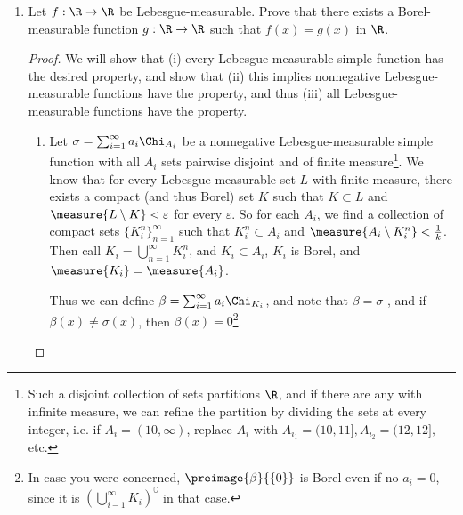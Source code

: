 \documentclass[12pt,letterpaper]{article}
\begin{document}
\begin{enumerate}
\pagebreak
\item Let $f:\R\to\R$ be Lebesgue-measurable. Prove that there exists a Borel-measurable function $g:\R\to\R$ such that $f(x)=g(x)$ \muae{} in $\R$. 
\begin{proof}
We will show that (i) every Lebesgue-measurable simple function has the desired property, and show that (ii) this implies nonnegative Lebesgue-measurable functions have the property, and thus (iii) all Lebesgue-measurable functions have the property. 
	\begin{enumerate}[label=(\roman*)]
	\item Let $\sigma	= \sum_{i=1}^\infty a_i \Chi_{A_i}$ be a nonnegative Lebesgue-measurable simple function with all $A_i$ sets pairwise disjoint and of finite measure\footnote{Such a disjoint collection of sets partitions $\R$, and if there are any with infinite measure, we can refine the partition by dividing the sets at every integer, i.e. if $A_i=(10,\infty)$, replace $A_i$ with $A_{i_1}=(10, 11], A_{i_2}=(12, 12],$ etc.}. 
We know that for every Lebesgue-measurable set $L$ with finite measure, there exists a compact (and thus Borel) set $K$ such that $K\subset L$ and $\measure{L\setminus K}<\varepsilon$ for every $\varepsilon$. So for each $A_i$, we find a collection of compact sets $\{K_i^n\}_{n=1}^\infty$ such that $K_i^n\subset A_i$ and $\measure{A_i\setminus K_i^n}<\frac{1}{k}$. Then call $K_i=\bigcup_{n=1}^\infty K_i^n$, and $K_i\subset A_i$, $K_i$ is Borel, and $\measure{K_i}=\measure{A_i}$. 

Thus we can define $\beta=\sum_{i=1}^\infty a_i \Chi_{K_i}$, and note that $\beta=\sigma$ \muae{}, and if $\beta(x)\neq\sigma(x)$, then $\beta(x)=0$\footnote{In case you were concerned, $\preimage{\beta}{\{0\}}$ is Borel even if no $a_i=0$, since it is $\left(\bigcup_{i-1}^\infty K_i\right)^\complement$ in that case.}. 


\end{enumerate}
\end{proof}
\end{enumerate}
\end{document}
